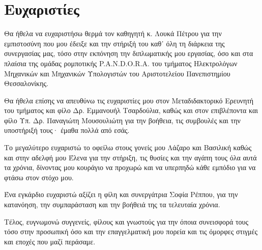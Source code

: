 \section*{Ευχαριστίες}
{}


Θα ήθελα να ευχαριστήσω θερμά τον καθηγητή κ. Λουκά Πέτρου
για την εμπιστοσύνη που μου έδειξε και την στήριξή του καθ᾽ όλη τη
διάρκεια της συνεργασίας μας, τόσο στην εκπόνηση την διπλωματικής
μου εργασίας, όσο και στα πλαίσια της ομάδας ρομποτικής P.A.N.D.O.R.A. του
τμήματος Ηλεκτρολόγων Μηχανικών και Μηχανικών Υπολογιστών
του Αριστοτελείου Πανεπιστημίου Θεσσαλονίκης.

Θα ήθελα επίσης να απευθύνω τις ευχαριστίες μου στον Μεταδιδακτορικό
Ερευνητή του τμήματος και φίλο Δρ. Εμμανουήλ Τσαρδούλια, καθώς και στον επιβλέποντα
και φίλο Υπ. Δρ. Παναγιώτη Μουσουλιώτη για την βοήθεια, τις συμβουλές και
την υποστήριξή τους· έμαθα πολλά από εσάς.

Το μεγαλύτερο ευχαριστώ το οφείλω στους γονείς μου Λάζαρο και Βασιλική καθώς
και στην αδελφή μου Έλενα για την στήριξη, τις θυσίες και την αγάπη τους όλα αυτά
τα χρόνια, δίνοντας μου κουράγιο να προχωρώ και να υπερπηδώ κάθε εμπόδιο
για να φτάσω στον στόχο μου.

Ένα εγκάρδιο ευχαριστώ αξίζει η φίλη και συνεργάτρια Σοφία Ρέππου,
για την κατανόηση, την συμπαράσταση και την βοήθειά της τα τελευταία
χρόνια.

Τέλος, ευγνωμονώ συγγενείς, φίλους και γνωστούς για την όποια
συνεισφορά τους τόσο στην προσωπική όσο και την επαγγελματική μου πορεία
και τις όμορφες στιγμές και εποχές που μαζί περάσαμε.
